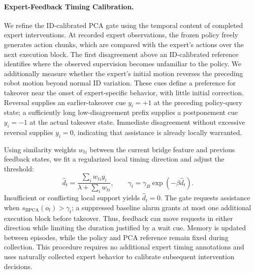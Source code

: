 \paragraph{Expert-Feedback Timing Calibration.}
We refine the ID-calibrated PCA gate using the temporal content of completed
expert interventions. At recorded expert observations, the frozen policy
freely generates action chunks, which are compared with the expert's actions
over the next execution block. The first disagreement above an ID-calibrated
reference identifies where the observed supervision becomes unfamiliar to
the policy. We additionally measure whether the expert's initial motion
reverses the preceding robot motion beyond normal ID variation. These cues
define a preference for takeover near the onset of expert-specific behavior,
with little initial correction. Reversal supplies an earlier-takeover cue
$y_i=+1$ at the preceding policy-query state; a sufficiently long
low-disagreement prefix supplies a postponement cue $y_i=-1$ at the actual
takeover state. Immediate disagreement without excessive reversal supplies
$y_i=0$, indicating that assistance is already locally warranted.

Using similarity weights $w_{ti}$ between the current bridge feature and
previous feedback states, we fit a regularized local timing direction and
adjust the threshold:
\begin{equation}
\widehat d_t=\frac{\sum_i w_{ti}y_i}{\lambda+\sum_i w_{ti}},
\qquad
\gamma_t=\gamma_B\exp(-\beta\widehat d_t).
\end{equation}
Insufficient or conflicting local support yields $\widehat d_t=0$.
The gate requests assistance when
$s_{\mathrm{BPCA}}(o_t)>\gamma_t$; a suppressed baseline alarm grants at most
one additional execution block before takeover. Thus, feedback can move
requests in either direction while limiting the duration justified by a
wait cue. Memory is updated between episodes, while the policy and PCA
reference remain fixed during collection. This procedure requires no
additional expert timing annotations and uses naturally collected expert
behavior to calibrate subsequent intervention decisions.
